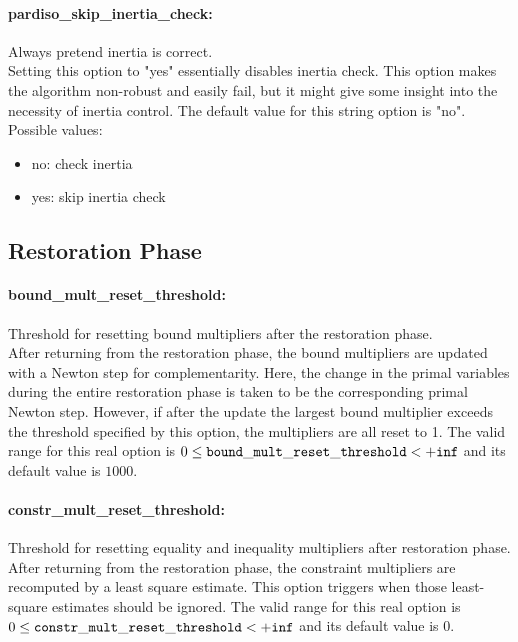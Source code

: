 \paragraph{pardiso\_skip\_inertia\_check:}\label{sec:pardiso_skip_inertia_check} Always pretend inertia is correct. $\;$ \\
 Setting this option to "yes" essentially disables
inertia check. This option makes the algorithm
non-robust and easily fail, but it might give
some insight into the necessity of inertia
control.
The default value for this string option is "no".
\\ 
Possible values:
\begin{itemize}
   \item no: check inertia
   \item yes: skip inertia check
\end{itemize}

\subsection{Restoration Phase}
\label{sec:Restoration_Phase}
\paragraph{bound\_mult\_reset\_threshold:}\label{sec:bound_mult_reset_threshold} Threshold for resetting bound multipliers after the restoration phase. $\;$ \\
 After returning from the restoration phase, the
bound multipliers are updated with a Newton step
for complementarity.  Here, the change in the
primal variables during the entire restoration
phase is taken to be the corresponding primal
Newton step. However, if after the update the
largest bound multiplier exceeds the threshold
specified by this option, the multipliers are all
reset to 1. The valid range for this real option is 
$0 \le {\tt bound\_mult\_reset\_threshold } <  {\tt +inf}$
and its default value is $1000$.


\paragraph{constr\_mult\_reset\_threshold:}\label{sec:constr_mult_reset_threshold} Threshold for resetting equality and inequality multipliers after restoration phase. $\;$ \\
 After returning from the restoration phase, the
constraint multipliers are recomputed by a least
square estimate.  This option triggers when those
least-square estimates should be ignored. The valid range for this real option is 
$0 \le {\tt constr\_mult\_reset\_threshold } <  {\tt +inf}$
and its default value is $0$.


